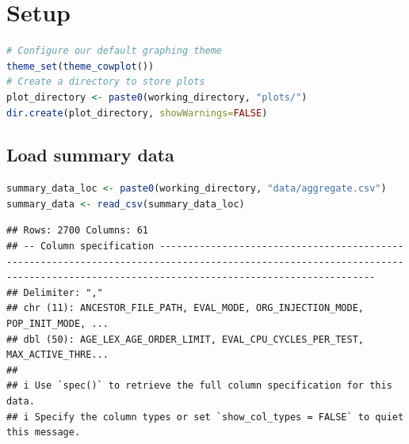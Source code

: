 \documentclass[
]{book}
\begin{document}
\hypertarget{setup}{%
\section{Setup}\label{setup}}

\begin{lstlisting}[language=R]
# Configure our default graphing theme
theme_set(theme_cowplot())
# Create a directory to store plots
plot_directory <- paste0(working_directory, "plots/")
dir.create(plot_directory, showWarnings=FALSE)
\end{lstlisting}

\hypertarget{load-summary-data}{%
\subsection{Load summary data}\label{load-summary-data}}

\begin{lstlisting}[language=R]
summary_data_loc <- paste0(working_directory, "data/aggregate.csv")
summary_data <- read_csv(summary_data_loc)
\end{lstlisting}

\begin{lstlisting}
## Rows: 2700 Columns: 61
## -- Column specification ----------------------------------------------------------------------------------------------------------------------------------------------------------------------------------
## Delimiter: ","
## chr (11): ANCESTOR_FILE_PATH, EVAL_MODE, ORG_INJECTION_MODE, POP_INIT_MODE, ...
## dbl (50): AGE_LEX_AGE_ORDER_LIMIT, EVAL_CPU_CYCLES_PER_TEST, MAX_ACTIVE_THRE...
## 
## i Use `spec()` to retrieve the full column specification for this data.
## i Specify the column types or set `show_col_types = FALSE` to quiet this message.
\end{lstlisting}
\end{document}
